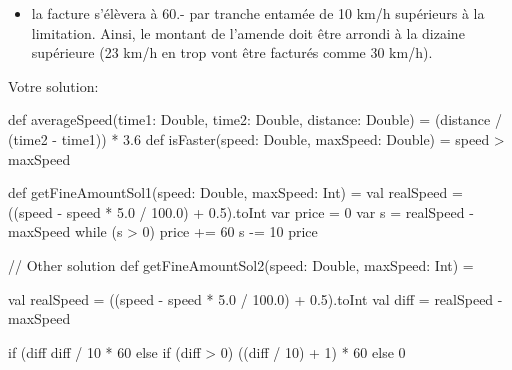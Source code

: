 \documentclass[10pt, a4paper, answers, addpoints]{\path exam}
\begin{document}
\begin{questions}
\begin{itemize}
    \item la facture s'élèvera à 60.- par tranche entamée de 10 km/h supérieurs à la limitation. Ainsi, le montant de l'amende doit être arrondi à la dizaine supérieure (23 km/h en trop vont être facturés comme 30 km/h).
\end{itemize}

\newpage
Votre solution:
\begin{solutionorbox}[\fill]
	\begin{scala}
		def averageSpeed(time1: Double, time2: Double, distance: Double) = (distance / (time2 - time1)) * 3.6
		def isFaster(speed: Double, maxSpeed: Double) = speed > maxSpeed
	  
		def getFineAmountSol1(speed: Double, maxSpeed: Int) = {
		  val realSpeed = ((speed - speed * 5.0 / 100.0) + 0.5).toInt
		  var price = 0
		  var s = realSpeed - maxSpeed
		  while (s > 0) {
			price += 60
			s -= 10
		  }
		  price
		}
	  
		// Other solution
		def getFineAmountSol2(speed: Double, maxSpeed: Int) = {
		  val realSpeed = ((speed - speed * 5.0 / 100.0) + 0.5).toInt
		  val diff = realSpeed - maxSpeed
	  
		  if (diff %
			diff / 10 * 60
		  else if (diff > 0)
			((diff / 10) + 1) * 60
		  else 0
		}
	\end{scala}
\end{solutionorbox}

\newpage
\lastPage 

\end{questions}
\end{document}
